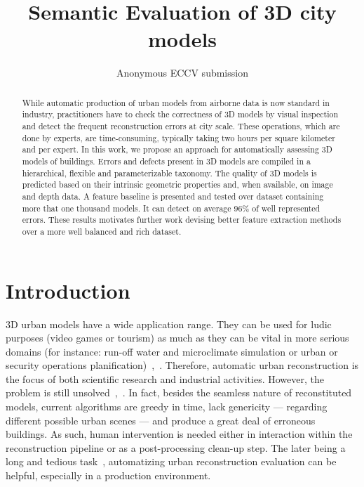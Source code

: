 \documentclass[runningheads]{llncs}
\begin{document}
\pagestyle{headings}
\mainmatter{}
\def\ECCV18SubNumber{***}  %

\title{Semantic Evaluation of 3D city models}

\titlerunning{ECCV-18 submission ID \ECCV18SubNumber}

\authorrunning{ECCV-18 submission ID \ECCV18SubNumber}

\author{Anonymous ECCV submission}
\institute{Paper ID \ECCV18SubNumber}

\maketitle

\begin{abstract}
    While automatic production of urban models from airborne data is now standard in industry, practitioners have to check the correctness of 3D models by visual inspection and detect the frequent reconstruction errors at city scale. These operations, which are done by experts, are time-consuming, typically taking two hours per square kilometer and per expert. In this work, we propose an approach for automatically assessing 3D models of buildings. Errors and defects present in 3D models are compiled in a hierarchical, flexible and parameterizable taxonomy. The quality of 3D models is predicted based on their intrinsic geometric properties and, when available, on image and depth data. A feature baseline is presented and tested over dataset containing more that one thousand models. It can detect on average $96\%$ of well represented errors. These results motivates further work devising better feature extraction methods over a more well balanced and rich dataset.
\end{abstract}

\section{Introduction}

    3D urban models have a wide application range. They can be used for ludic purposes (video games or tourism) as much as they can be vital in more serious domains (for instance: run-off water and microclimate simulation or urban or security operations planification)~\cite{Biljecki2015},~\cite{Musialski2012}. Therefore, automatic urban reconstruction is the focus of both scientific research and industrial activities. However, the problem is still unsolved~\cite{Musialski2012},~\cite{rottensteiner2014results}. In fact, besides the seamless nature of reconstituted models, current algorithms are greedy in time, lack genericity --- regarding different possible urban scenes --- and produce a great deal of erroneous buildings. As such, human intervention is needed either in interaction within the reconstruction pipeline or as a post-processing clean-up step. The later being a long and tedious task~\cite{Musialski2012}, automatizing urban reconstruction evaluation can be helpful, especially in a production environment.
\end{document}
